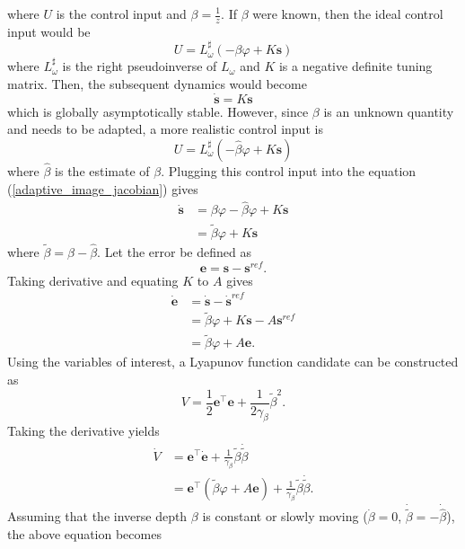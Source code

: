 where $U$ is the control input and $\beta=\frac{1}{z}$. If $\beta$ were known, then the ideal control input would be
\begin{equation}
U=L_\omega^\sharp(-\beta\varphi+K\mathbf{s})
\end{equation}
where $L_\omega^\sharp$ is the right pseudoinverse of $L_\omega$ and $K$ is a negative definite tuning matrix. Then, the subsequent dynamics would become
\begin{equation}
\mathbf{\dot{s}}=K\mathbf{s}
\end{equation}
which is globally asymptotically stable. However, since $\beta$ is an unknown quantity and needs to be adapted, a more realistic control input is
\begin{equation}
U=L_\omega^\sharp(-\hat{\beta}\varphi+K\mathbf{s})
\end{equation}
where $\hat{\beta}$ is the estimate of $\beta$. Plugging this control input into the equation (\ref{adaptive_image_jacobian}) gives
\begin{align}
\mathbf{\dot{s}}&=\beta\varphi-\hat{\beta}\varphi+K\mathbf{s}
\\&= \tilde{\beta}\varphi+K\mathbf{s}
\end{align}
where $\tilde{\beta}=\beta-\hat{\beta}$. Let the error be defined as 
\begin{equation}
\mathbf{e}=\mathbf{s}-\mathbf{s}^{ref}.
\end{equation}
Taking derivative and equating $K$ to $A$ gives
\begin{align}
\dot{\mathbf{e}}&=\dot{\mathbf{s}}-\dot{\mathbf{s}}^{ref}
\\&=\tilde{\beta}\varphi+K\mathbf{s}-A\mathbf{s}^{ref}
\\&=\tilde{\beta}\varphi+A\mathbf{e}.
\end{align}
Using the variables of interest, a Lyapunov function candidate can be constructed as 
\begin{equation}
V=\frac{1}{2}\mathbf{e}^\top\mathbf{e}+\frac{1}{2\gamma_\beta}\tilde{\beta}^2.
\end{equation}
Taking the derivative yields
\begin{align}
\dot{V}&=\mathbf{e}^\top\dot{\mathbf{e}}+\frac{1}{\gamma_\beta}\tilde{\beta}\dot{\tilde{\beta}}
\\&=\mathbf{e}^\top(\tilde{\beta}\varphi+A\mathbf{e})+\frac{1}{\gamma_\beta}\tilde{\beta}\dot{\tilde{\beta}}.
\label{vdot2}
\end{align}
Assuming that the inverse depth $\beta$ is constant or slowly moving ($\dot{\beta}=0$, $\dot{\tilde{\beta}}=-\dot{\hat{\beta}}$), the above equation becomes
